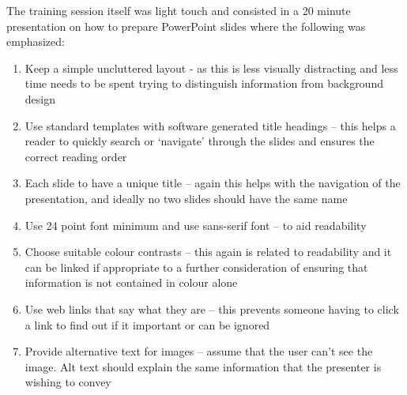 \documentclass[11.5pt]{sig-alternate} %
\begin{document}
\begin{large}
The training session itself was light touch and consisted in a 20 minute presentation on how to prepare PowerPoint slides where the following was emphasized: 

\begin{enumerate}
    \item Keep a simple uncluttered layout - as this is less visually distracting and less time needs to be spent trying to distinguish information from background design
    \item Use standard templates with software generated title headings – this helps a reader to quickly search or ‘navigate’ through the slides and ensures the correct reading order
    \item Each slide to have a unique title – again this helps with the navigation of the presentation, and ideally no two slides should have the same name
    \item Use 24 point font minimum and use sans-serif font – to aid readability
    \item Choose suitable colour contrasts – this again is related to readability and it can be linked if appropriate to a further consideration of ensuring that information is not contained in colour alone 
    \item Use web links that say what they are – this prevents someone having to click a link to find out if it important or can be ignored
    \item Provide alternative text for images – assume that the user can’t see the image. Alt text should explain the same information that the presenter is wishing to convey
\end{enumerate}


\end{large}
\end{document}
